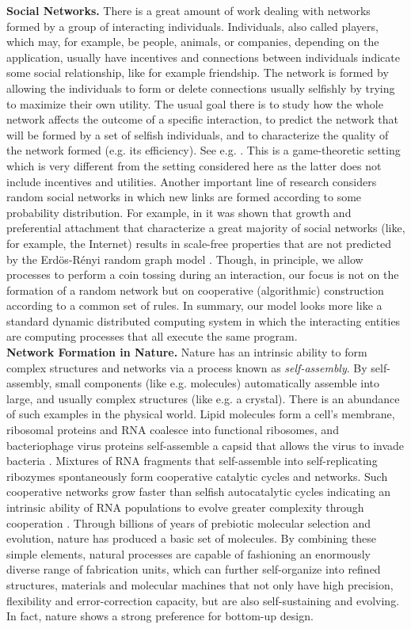 \documentclass[oribibl, 11pt]{llncs}
\begin{document}
\noindent\textbf{Social Networks.} There is a great amount of work dealing with networks formed by a group of interacting individuals. Individuals, also called players, which may, for example, be people, animals, or companies, depending on the application, usually have incentives and connections between individuals indicate some social relationship, like for example friendship. The network is formed by allowing the individuals to form or delete connections usually selfishly by trying to maximize their own utility. The usual goal there is to study how the whole network affects the outcome of a specific interaction, to predict the network that will be formed by a set of selfish individuals, and to characterize the quality of the network formed (e.g. its efficiency). See e.g. \cite{Ja05,BEK13}. This is a game-theoretic setting which is very different from the setting considered here as the latter does not include incentives and utilities. Another important line of research considers random social networks in which new links are formed according to some probability distribution. For example, in \cite{BA99} it was shown that growth and preferential attachment that characterize a great majority of social networks (like, for example, the Internet) results in scale-free properties that are not predicted by the Erd\"{o}s-R\'{e}nyi random graph model \cite{ER59,Bo01}. Though, in principle, we allow processes to perform a coin tossing during an interaction, our focus is not on the formation of a random network but on cooperative (algorithmic) construction according to a common set of rules. In summary, our model looks more like a standard dynamic distributed computing system in which the interacting entities are computing processes that all execute the same program.\\

\noindent\textbf{Network Formation in Nature.} Nature has an intrinsic ability to form complex structures and networks via a process known as \emph{self-assembly}. By self-assembly, small components (like e.g. molecules) automatically assemble into large, and usually complex structures (like e.g. a crystal). There is an abundance of such examples in the physical world. Lipid molecules form a cell's membrane, ribosomal proteins and RNA coalesce into functional ribosomes, and bacteriophage virus proteins self-assemble a capsid that allows the virus to invade bacteria \cite{Do12}. Mixtures of RNA fragments that self-assemble into self-replicating ribozymes spontaneously form cooperative catalytic cycles and networks. Such cooperative networks grow faster than selfish autocatalytic cycles indicating an intrinsic ability of RNA populations to evolve greater complexity through cooperation \cite{VMC12}. Through billions of years of prebiotic molecular selection and evolution, nature has produced a basic set of molecules. By combining these simple elements, natural processes are capable of fashioning an enormously diverse range of fabrication units, which can further self-organize into refined structures, materials and molecular machines that not only have high precision, flexibility and error-correction capacity, but are also self-sustaining and evolving. In fact, nature shows a strong preference for bottom-up design.
\end{document}
